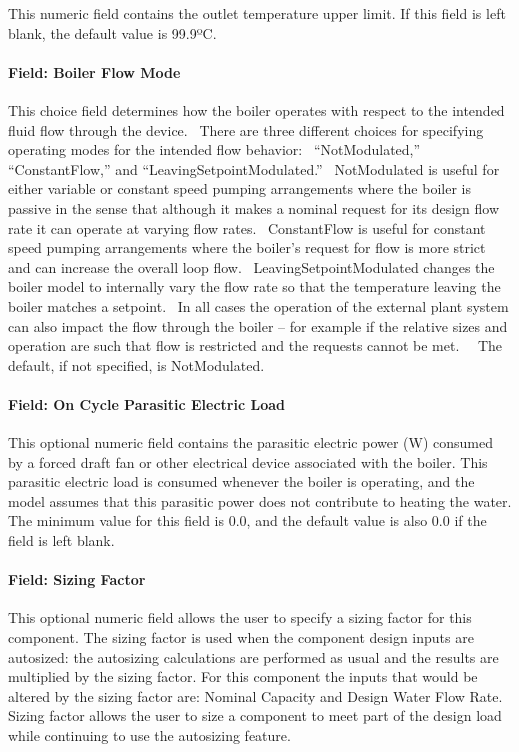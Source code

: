 This numeric field contains the outlet temperature upper limit. If this field is left blank, the default value is 99.9ºC.

\paragraph{Field: Boiler Flow Mode}\label{field-boiler-flow-mode}

This choice field determines how the boiler operates with respect to the intended fluid flow through the device.~ There are three different choices for specifying operating modes for the intended flow behavior:~ ``NotModulated,'' ``ConstantFlow,'' and ``LeavingSetpointModulated.''~ NotModulated is useful for either variable or constant speed pumping arrangements where the boiler is passive in the sense that although it makes a nominal request for its design flow rate it can operate at varying flow rates.~ ConstantFlow is useful for constant speed pumping arrangements where the boiler's request for flow is more strict and can increase the overall loop flow.~ LeavingSetpointModulated changes the boiler model to internally vary the flow rate so that the temperature leaving the boiler matches a setpoint.~ In all cases the operation of the external plant system can also impact the flow through the boiler -- for example if the relative sizes and operation are such that flow is restricted and the requests cannot be met.~~ The default, if not specified, is NotModulated.

\paragraph{Field: On Cycle Parasitic Electric Load}\label{field-parasitic-electric-load-000}

This optional numeric field contains the parasitic electric power (W) consumed by a forced draft fan or other electrical device associated with the boiler. This parasitic electric load is consumed whenever the boiler is operating, and the model assumes that this parasitic power does not contribute to heating the water. The minimum value for this field is 0.0, and the default value is also 0.0 if the field is left blank.

\paragraph{Field: Sizing Factor}\label{field-sizing-factor-10}

This optional numeric field allows the user to specify a sizing factor for this component. The sizing factor is used when the component design inputs are autosized: the autosizing calculations are performed as usual and the results are multiplied by the sizing factor. For this component the inputs that would be altered by the sizing factor are: Nominal Capacity and Design Water Flow Rate. Sizing factor allows the user to size a component to meet part of the design load while continuing to use the autosizing feature.

